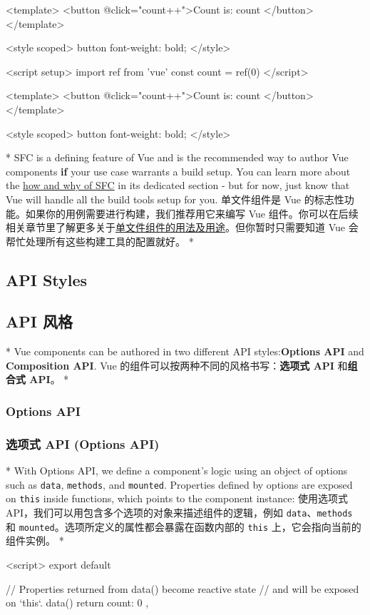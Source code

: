 \begin{paracol}{2}
\begin{codeVue}
<template>
    <button @click="count++">Count is: {{ count }}</button>
</template>

<style scoped>
button {
    font-weight: bold;
}
</style>
\end{codeVue}
\switchcolumn
\begin{codeVue}
<script setup>
import { ref } from 'vue'
const count = ref(0)
</script>

<template>
    <button @click="count++">Count is: {{ count }}</button>
</template>

<style scoped>
button {
    font-weight: bold;
}
</style>
\end{codeVue}
\switchcolumn[0]*%
SFC is a defining feature of Vue and is the recommended way to author
Vue components \textbf{if} your use case warrants a build setup. You can
learn more about the \href{https://vuejs.org/guide/scaling-up/sfc}{how
and why of SFC} in its dedicated section - but for now, just know that
Vue will handle all the build tools setup for you.
\switchcolumn
单文件组件是 Vue
的标志性功能。如果你的用例需要进行构建，我们推荐用它来编写 Vue
组件。你可以在后续相关章节里了解更多关于\href{https://cn.vuejs.org/guide/scaling-up/sfc.html}{单文件组件的用法及用途}。但你暂时只需要知道
Vue 会帮忙处理所有这些构建工具的配置就好。
\switchcolumn[0]*%
\subsection{API Styles}
\switchcolumn
\subsection{API 风格}
\switchcolumn[0]*%
Vue components can be authored in two different API styles:\textbf{Options API} and \textbf{Composition API}.
\switchcolumn
Vue 的组件可以按两种不同的风格书写：\textbf{选项式 API} 和\textbf{组合式
API}。
\switchcolumn[0]*%
\subsubsection{Options API}
\switchcolumn
\subsubsection{选项式 API (Options API)}
\switchcolumn[0]*%
With Options API, we define a component's logic using an object of
options such as \texttt{data}, \texttt{methods}, and \texttt{mounted}.
Properties defined by options are exposed on \texttt{this} inside
functions, which points to the component instance:
\switchcolumn
使用选项式 API，我们可以用包含多个选项的对象来描述组件的逻辑，例如
\texttt{data}、\texttt{methods} 和
\texttt{mounted}。选项所定义的属性都会暴露在函数内部的 \texttt{this}
上，它会指向当前的组件实例。
\switchcolumn[0]*%
\begin{codeVue}
    <script>
    export default {
      // Properties returned from data() become reactive state
      // and will be exposed on `this`.
      data() {
        return {
          count: 0
        }
      },
    
}
\end{codeVue}
\end{paracol}
